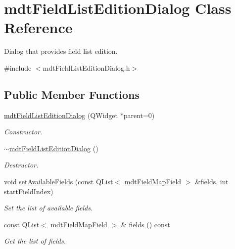 \hypertarget{classmdt_field_list_edition_dialog}{
\section{mdtFieldListEditionDialog Class Reference}
\label{classmdt_field_list_edition_dialog}
}


Dialog that provides field list edition.  




{\ttfamily \#include $<$mdtFieldListEditionDialog.h$>$}

\subsection*{Public Member Functions}
\begin{DoxyCompactItemize}
\item 
\hypertarget{classmdt_field_list_edition_dialog_a02c3cefeff70eedb41ff5caa2a52d5e4}{
\hyperlink{classmdt_field_list_edition_dialog_a02c3cefeff70eedb41ff5caa2a52d5e4}{mdtFieldListEditionDialog} (QWidget $\ast$parent=0)}
\label{classmdt_field_list_edition_dialog_a02c3cefeff70eedb41ff5caa2a52d5e4}

\begin{DoxyCompactList}\small\item\em Constructor. \end{DoxyCompactList}\item 
\hypertarget{classmdt_field_list_edition_dialog_a39b7995b9ea9d7343ae09b2272b39b26}{
\hyperlink{classmdt_field_list_edition_dialog_a39b7995b9ea9d7343ae09b2272b39b26}{$\sim$mdtFieldListEditionDialog} ()}
\label{classmdt_field_list_edition_dialog_a39b7995b9ea9d7343ae09b2272b39b26}

\begin{DoxyCompactList}\small\item\em Destructor. \end{DoxyCompactList}\item 
void \hyperlink{classmdt_field_list_edition_dialog_a9eea066d1862f978c00e038471a95fff}{setAvailableFields} (const QList$<$ \hyperlink{classmdt_field_map_field}{mdtFieldMapField} $>$ \&fields, int startFieldIndex)
\begin{DoxyCompactList}\small\item\em Set the list of available fields. \end{DoxyCompactList}\item 
\hypertarget{classmdt_field_list_edition_dialog_a10de0f00e5639bd3f2442f25423557ec}{
const QList$<$ \hyperlink{classmdt_field_map_field}{mdtFieldMapField} $>$ \& \hyperlink{classmdt_field_list_edition_dialog_a10de0f00e5639bd3f2442f25423557ec}{fields} () const }
\label{classmdt_field_list_edition_dialog_a10de0f00e5639bd3f2442f25423557ec}

\begin{DoxyCompactList}\small\item\em Get the list of fields. \end{DoxyCompactList}\end{DoxyCompactItemize}


